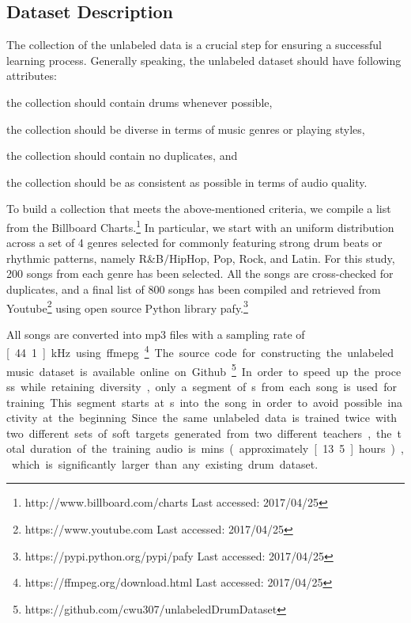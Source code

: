 \documentclass{article}
\begin{document}
\subsection{Dataset Description}
The collection of the unlabeled data is a crucial step for ensuring a successful learning process. Generally speaking, the unlabeled dataset should have following attributes: 
\begin{inparaenum}[(i)]
    \item   the collection should contain drums whenever possible,
    \item   the collection should be diverse in terms of music genres or playing styles,
    \item   the collection should contain no duplicates, and
    \item   the collection should be as consistent as possible in terms of audio quality. 
\end{inparaenum}
To build a collection that meets the above-mentioned criteria, we compile a list from the Billboard Charts.\footnote{http://www.billboard.com/charts Last accessed: 2017/04/25} In particular, we start with an uniform distribution across a set of 4 genres selected for commonly featuring strong drum beats or rhythmic patterns, namely R\&B$\slash$HipHop, Pop, Rock, and Latin. For this study, 200 songs from each genre has been selected. All the songs are cross-checked for duplicates, and a final list of 800 songs has been compiled and retrieved from Youtube\footnote{https://www.youtube.com Last accessed: 2017/04/25} using open source Python library pafy.\footnote{https://pypi.python.org/pypi/pafy Last accessed: 2017/04/25} 

All songs are converted into mp3 files with a sampling rate of \unit[44.1]{kHz} using ffmepg.\footnote{https://ffmpeg.org/download.html Last accessed: 2017/04/25} The source code for constructing the unlabeled music dataset is available online on Github.\footnote{https://github.com/cwu307/unlabeledDrumDataset} In order to speed up the process while retaining diversity, only a segment of \unit[30]{s} from each song is used for training. This segment starts at \unit[30]{s} into the song in order to avoid possible inactivity at the beginning. Since the same unlabeled data is trained twice with two different sets of soft targets generated from two different teachers, the total duration of the training audio is \unit[800]{mins} (approximately \unit[13.5]{hours}), which is significantly larger than any existing drum dataset. 
\end{document}
